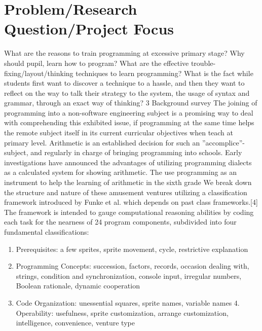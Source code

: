 \section{Problem/Research Question/Project Focus}
What are the reasons to train programming at excessive primary stage? Why should pupil, learn how to program? What are the effective trouble-fixing/layout/thinking techniques to learn programming? What is the fact while students first want to discover a technique to a hassle, and then they want to reflect on the way to
talk their strategy to the system, the usage of syntax and grammar, through an exact way of thinking?
3	Background survey
The joining of programming into a non-software engineering subject is a promising way to deal with comprehending this exhibited issue, if programming at the same time helps the remote subject itself in its current curricular objectives when teach at primary level. Arithmetic is an established decision for such an ”accomplice”- subject, and regularly in charge of bringing programming into schools. Early investigations have announced the advantages of utilizing programming dialects as a calculated system for showing arithmetic. The use programming as an instrument to help the learning of arithmetic in the sixth grade We break down the structure and nature of these amusement ventures utilizing a classification framework introduced by Funke et al. which depends on past class frameworks.[4] The framework is intended to gauge computational reasoning abilities by coding each task for the nearness of 24 program components, subdivided into four fundamental classifications:
\begin{enumerate}
\item  Prerequisites: a few sprites, sprite movement, cycle, restrictive explanation 
\item  Programming Concepts: succession, factors, records, occasion dealing with, strings, condition and synchronization, console input, irregular numbers, Boolean rationale, dynamic cooperation
\item Code Organization: unessential squares, sprite names, variable names 4. Operability: usefulness, sprite customization, arrange customization, intelligence, convenience, venture type
\end{enumerate}
